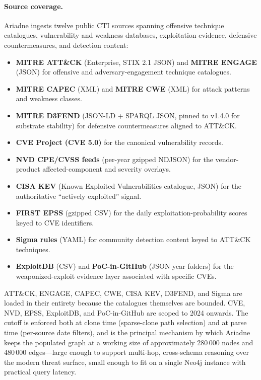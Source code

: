 \documentclass[unnumsec,webpdf,contemporary,large]{oup-authoring-template}
\theoremstyle{thmstyleone}
\theoremstyle{thmstyletwo}
\theoremstyle{thmstylethree}
\begin{document}
\paragraph{Source coverage.}
Ariadne ingests twelve public CTI sources spanning offensive technique catalogues, vulnerability and weakness databases, exploitation evidence, defensive countermeasures, and detection content:

\begin{itemize}
  \item \textbf{MITRE ATT\&CK} (Enterprise, STIX 2.1 JSON) and \textbf{MITRE ENGAGE} (JSON) for offensive and adversary-engagement technique catalogues.
  \item \textbf{MITRE CAPEC} (XML) and \textbf{MITRE CWE} (XML) for attack patterns and weakness classes.
  \item \textbf{MITRE D3FEND} (JSON-LD + SPARQL JSON, pinned to v1.4.0 for substrate stability) for defensive countermeasures aligned to ATT\&CK.
  \item \textbf{CVE Project (CVE 5.0)} for the canonical vulnerability records.
  \item \textbf{NVD CPE/CVSS feeds} (per-year gzipped NDJSON) for the vendor-product affected-component and severity overlays.
  \item \textbf{CISA KEV} (Known Exploited Vulnerabilities catalogue, JSON) for the authoritative ``actively exploited'' signal.
  \item \textbf{FIRST EPSS} (gzipped CSV) for the daily exploitation-probability scores keyed to CVE identifiers.
  \item \textbf{Sigma rules} (YAML) for community detection content keyed to ATT\&CK techniques.
  \item \textbf{ExploitDB} (CSV) and \textbf{PoC-in-GitHub} (JSON year folders) for the weaponized-exploit evidence layer associated with specific CVEs.
\end{itemize}

ATT\&CK, ENGAGE, CAPEC, CWE, CISA KEV, D3FEND, and Sigma are loaded in their entirety because the catalogues themselves are bounded. CVE, NVD, EPSS, ExploitDB, and PoC-in-GitHub are scoped to 2024 onwards. The cutoff is enforced both at clone time (sparse-clone path selection) and at parse time (per-source date filters), and is the principal mechanism by which Ariadne keeps the populated graph at a working size of approximately 280\,000 nodes and 480\,000 edges---large enough to support multi-hop, cross-schema reasoning over the modern threat surface, small enough to fit on a single Neo4j instance with practical query latency.
\end{document}
